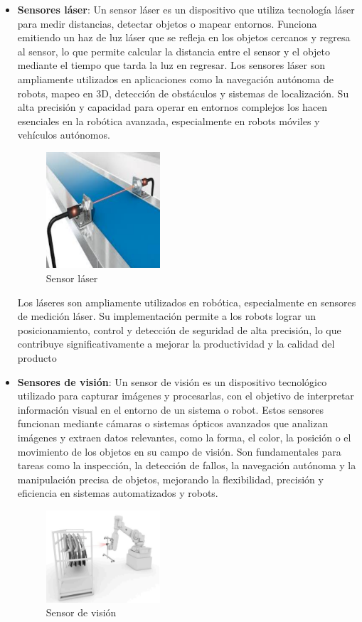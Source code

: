 \documentclass{article}
\begin{document}
\begin{itemize}
		\item \textbf{Sensores láser}: Un sensor láser es un dispositivo que utiliza tecnología láser para medir distancias, detectar objetos o mapear entornos. Funciona emitiendo un haz de luz láser que se refleja en los
		objetos cercanos y regresa al sensor, lo que permite calcular la distancia entre el sensor y el
		objeto mediante el tiempo que tarda la luz en regresar. Los sensores láser son ampliamente
		utilizados en aplicaciones como la navegación autónoma de robots, mapeo en 3D,
		detección de obstáculos y sistemas de localización. Su alta precisión y capacidad para
		operar en entornos complejos los hacen esenciales en la robótica avanzada, especialmente
		en robots móviles y vehículos autónomos.
		\begin{figure}[H]
			\centering
			\includegraphics[width=0.4\textwidth]{sensorlaser.png}
			\caption{Sensor láser} 
		\end{figure}
		
		Los láseres son ampliamente utilizados en robótica, especialmente en sensores de
		medición láser. Su implementación permite a los robots lograr un posicionamiento, control y
		detección de seguridad de alta precisión, lo que contribuye significativamente a mejorar la
		productividad y la calidad del producto
		
		
		\item \textbf{Sensores de visión}: Un sensor de visión es un dispositivo tecnológico utilizado para capturar imágenes y procesarlas, con el objetivo de interpretar información visual en el entorno de un sistema o
		robot. Estos sensores funcionan mediante cámaras o sistemas ópticos avanzados que
		analizan imágenes y extraen datos relevantes, como la forma, el color, la posición o el
		movimiento de los objetos en su campo de visión. Son fundamentales para tareas como la
		inspección, la detección de fallos, la navegación autónoma y la manipulación precisa de
		objetos, mejorando la flexibilidad, precisión y eficiencia en sistemas automatizados y robots.
			\begin{figure}[H]
			\centering
			\includegraphics[width=0.4\textwidth]{sensordevis.png}
			\caption{Sensor de visión} 
		\end{figure}
		

\end{itemize}
\end{document}
